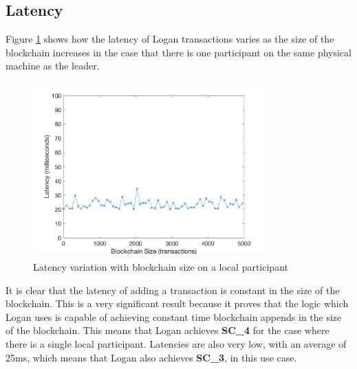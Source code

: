 \documentclass[12pt,a4paper,twoside,openright]{report}
\begin{document}
	\subsection{Latency}
	Figure \ref{fig:locallatency} shows how the latency of Logan transactions varies as the size of the blockchain increases in the case that there is one participant on the same physical machine as the leader. 
	\begin{figure}
		\centering
		\includegraphics[width=0.8\textwidth]{figs/local_latency_vs_size.png}
		\caption{Latency variation with blockchain size on a local participant}
		\label{fig:locallatency}
	\end{figure}
	It is clear that the latency of adding a transaction is constant in the size of the blockchain.
	This is a very significant result because it proves that the logic which Logan uses is capable of achieving constant time blockchain appends in the size of the blockchain.
	This means that Logan achieves \textbf{SC\_4} for the case where there is a single local participant.
	Latencies are also very low, with an average of 25ms, which means that Logan also achieves \textbf{SC\_3}, in this use case.\\
\end{document}

